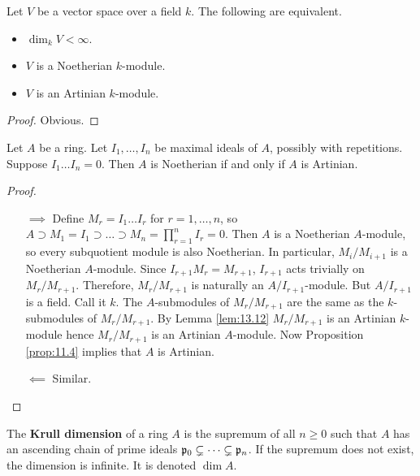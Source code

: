 \begin{lemma}
\label{lem:13.12}
Let $ V $ be a vector space over a field $ k $. The following are equivalent.
\begin{itemize}
\item $ \dim_k V < \infty $.
\item $ V $ is a Noetherian $ k $-module.
\item $ V $ is an Artinian $ k $-module.
\end{itemize}
\end{lemma}

\begin{proof}
Obvious.
\end{proof}

\begin{lemma}
\label{lem:13.13}
Let $ A $ be a ring. Let $ I_1, \dots, I_n $ be maximal ideals of $ A $, possibly with repetitions. Suppose $ I_1 \dots I_n = 0 $. Then $ A $ is Noetherian if and only if $ A $ is Artinian.
\end{lemma}

\begin{proof}
\hfill
\begin{itemize}
\item[$ \implies $] Define $ M_r = I_1 \dots I_r $ for $ r = 1, \dots, n $, so $ A \supset M_1 = I_1 \supset \dots \supset M_n = \prod_{r = 1}^n I_r = 0 $. Then $ A $ is a Noetherian $ A $-module, so every subquotient module is also Noetherian. In particular, $ M_i / M_{i + 1} $ is a Noetherian $ A $-module. Since $ I_{r + 1}M_r = M_{r + 1} $, $ I_{r + 1} $ acts trivially on $ M_r / M_{r + 1} $. Therefore, $ M_r / M_{r + 1} $ is naturally an $ A / I_{r + 1} $-module. But $ A / I_{r + 1} $ is a field. Call it $ k $. The $ A $-submodules of $ M_r / M_{r + 1} $ are the same as the $ k $-submodules of $ M_r / M_{r + 1} $. By Lemma \ref{lem:13.12} $ M_r / M_{r + 1} $ is an Artinian $ k $-module hence $ M_r / M_{r + 1} $ is an Artinian $ A $-module. Now Proposition \ref{prop:11.4} implies that $ A $ is Artinian.
\item[$ \impliedby $] Similar.
\end{itemize}
\end{proof}

\begin{definition}
The \textbf{Krull dimension} of a ring $ A $ is the supremum of all $ n \ge 0 $ such that $ A $ has an ascending chain of prime ideals $ \mathfrak{p}_0 \subsetneq \dots \subsetneq \mathfrak{p}_n $. If the supremum does not exist, the dimension is infinite. It is denoted $ \dim A $.
\end{definition}

